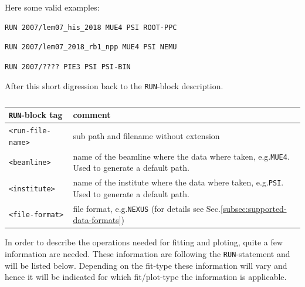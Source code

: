 \documentclass[twoside]{article}
\begin{document}
\noindent Here some valid examples:

\begin{verbatim}
RUN 2007/lem07_his_2018 MUE4 PSI ROOT-PPC
\end{verbatim}

\begin{verbatim}
RUN 2007/lem07_2018_rb1_npp MUE4 PSI NEMU
\end{verbatim}

\begin{verbatim}
RUN 2007/???? PIE3 PSI PSI-BIN
\end{verbatim}

\noindent After this short digression back to the \texttt{RUN}-block description. 

\begin{table}[h]
 \centering
 \begin{tabular}{|l|l|} \hline
   \textbf{\texttt{RUN}-block tag} & \textbf{comment} \\ \hline\hline
   \texttt{<run-file-name>} & sub path and filename without extension \\ \hline
   \texttt{<beamline>}      & \begin{minipage}{12cm}
                              name of the beamline where the data where taken, 
                              e.g.\xspace \texttt{MUE4}. Used to generate a
                              default path.
                              \end{minipage} \\ \hline
   \texttt{<institute>}     & \begin{minipage}{12cm}
                              name of the institute where the data where taken, 
                              e.g.\xspace \texttt{PSI}. Used to generate a
                              default path.
                              \end{minipage} \\ \hline
   \texttt{<file-format>}   & file format, e.g.\xspace \texttt{NEXUS} (for details 
                              see Sec.\ref{subsec:supported-data-formats})\\ \hline
 \end{tabular}
 \caption{}\label{tab:run-block}
\end{table}

\noindent In order to describe the operations needed for fitting and ploting, quite a few information are needed. These information are following the \texttt{RUN}-statement and will be listed below. Depending on the fit-type these information will vary and hence it will be indicated for which fit/plot-type the information is applicable.
\end{document}
